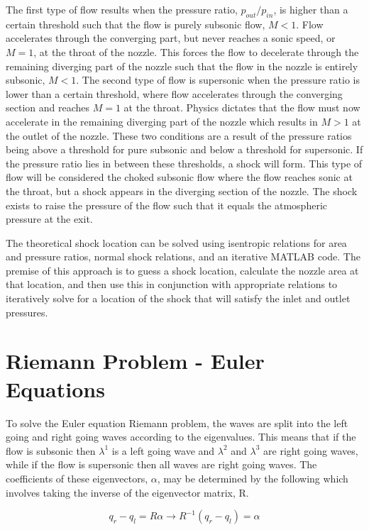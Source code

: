 \documentclass[11pt]{article}%
\numberwithin{equation}{section}
\begin{document}
The first type of flow results when the pressure ratio, $p_{out} / p_{in}$, is higher than a certain threshold such that the flow is purely subsonic flow, $M < 1$. Flow accelerates through the converging part, but never reaches a sonic speed, or $M = 1$, at the throat of the nozzle. This forces the flow to decelerate through the remaining diverging part of the nozzle such that the flow in the nozzle is entirely subsonic, $M < 1$. The second type of flow is supersonic when the pressure ratio is lower than a certain threshold, where flow accelerates through the converging section and reaches $M = 1$ at the throat. Physics dictates that the flow must now accelerate in the remaining diverging part of the nozzle which results in $M > 1$ at the outlet of the nozzle. These two conditions are a result of the pressure ratios being above a threshold for pure subsonic and below a threshold for supersonic. If the pressure ratio lies in between these thresholds, a shock will form. This type of flow will be considered the choked subsonic flow where the flow reaches sonic at the throat, but a shock appears in the diverging section of the nozzle. The shock exists to raise the pressure of the flow such that it equals the atmospheric pressure at the exit.

The theoretical shock location can be solved using isentropic relations for area and pressure ratios, normal shock relations, and an iterative MATLAB code. The premise of this approach is to guess a shock location, calculate the nozzle area at that location, and then use this in conjunction with appropriate relations to iteratively solve for a location of the shock that will satisfy the inlet and outlet pressures.

\section{Riemann Problem - Euler Equations}
To solve the Euler equation Riemann problem, the waves are split into the left going and right going waves according to the eigenvalues. This means that if the flow is subsonic then $\lambda^1$ is a left going wave and $\lambda^2$ and $\lambda^3$ are right going waves, while if the flow is supersonic then all waves are right going waves. The coefficients of these eigenvectors, $\alpha$, may be determined by the following which involves taking the inverse of the eigenvector matrix, R.

\begin{equation}
q_r - q_l = R \alpha \rightarrow R^{-1} (q_r - q_l) = \alpha \label{alphaeqn}
\end{equation}
\end{document}
